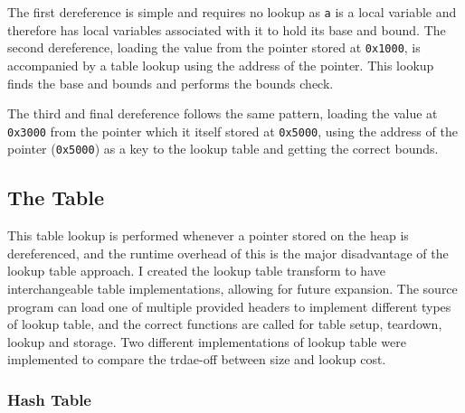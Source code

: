 The first dereference is simple and requires no lookup as \verb!a! is a local variable and therefore has local variables associated with it to hold its base and bound.
The second dereference, loading the value from the pointer stored at \verb!0x1000!, is accompanied by a table lookup using the address of the pointer.
This lookup finds the base and bounds and performs the bounds check.

The third and final dereference follows the same pattern, loading the value at \verb!0x3000! from the pointer which it itself stored at \verb!0x5000!, using the address of the pointer (\verb!0x5000!) as a key to the lookup table and getting the correct bounds.

\subsection{The Table}

This table lookup is performed whenever a pointer stored on the heap is dereferenced, and the runtime overhead of this is the major disadvantage of the lookup table approach.
I created the lookup table transform to have interchangeable table implementations, allowing for future expansion.
The source program can load one of multiple provided headers to implement different types of lookup table, and the correct functions are called for table setup, teardown, lookup and storage.
Two different implementations of lookup table were implemented to compare the trdae-off between size and lookup cost.

%
%

\subsubsection{Hash Table}

